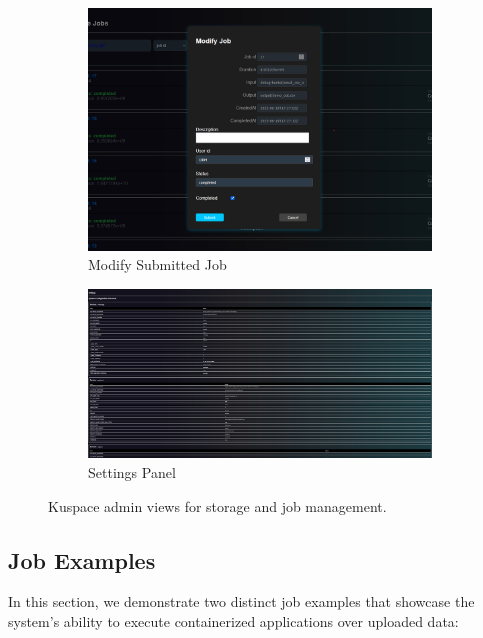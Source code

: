 \begin{figure}[!htbp]
    \centering
    \begin{subfigure}[b]{0.48\textwidth}
        \includegraphics[width=\textwidth]{Images/kuspace_admin_ModifyJob.png}
        \caption{Modify Submitted Job}
        \label{fig:adminmodifyjob}
    \end{subfigure}
    \hfill
    \begin{subfigure}[b]{0.48\textwidth}
        \includegraphics[width=\textwidth]{Images/kuspace_admin_Settings.png}
        \caption{Settings Panel}
        \label{fig:adminsettings}
    \end{subfigure}
    \caption{Kuspace admin views for storage and job management.}
\end{figure}
\vspace{0.5em}
\noindent


\newpage
\subsection{Job Examples}

In this section, we demonstrate two distinct job examples that showcase the system's ability to execute containerized applications over uploaded data:

